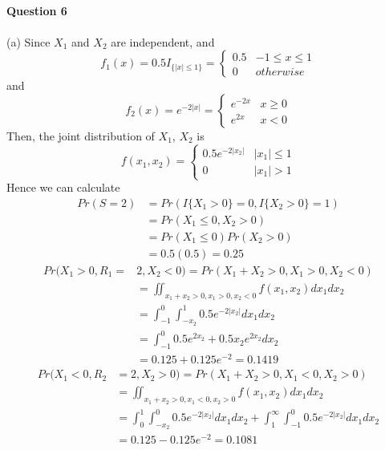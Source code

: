 \documentclass[12pt,a4paper]{article}
\begin{document}
\newpage
~\\
\indent \textbf{Question 6}\\
~\\
(a) Since $X_{1}$ and $X_{2}$ are independent, and
\begin{equation*}
f_{1}(x)=0.5I_{\{|x|\leqslant1\}}=
\begin{cases}
0.5& -1\leqslant x \leqslant 1\\
0& otherwise
\end{cases}
\end{equation*}
and
\begin{equation*}
f_{2}(x)=e^{-2|x|}=
\begin{cases}
e^{-2x}& x\geqslant 0\\
e^{2x}& x<0
\end{cases}
\end{equation*}
Then, the joint distribution of $X_{1}$, $X_{2}$ is
\begin{equation*}
f(x_{1},x_{2})=
\begin{cases}
0.5e^{-2|x_{2}|}& |x_{1}|\leqslant 1\\
0& |x_{1}|>1
\end{cases}
\end{equation*}
Hence we can calculate
\begin{align*}
Pr(S=2)&=Pr\left(I\{X_{1}>0\}=0,I\{X_{2}>0\}=1\right)\\
&=Pr(X_{1}\leqslant 0, X_{2}>0)\\
&=Pr(X_{1}\leqslant0)Pr(X_{2}>0)\\
&=0.5(0.5)=0.25
\end{align*}
\begin{align*}
Pr(X_{1}>0,R_{1}=&2,X_{2}<0)=Pr(X_{1}+X_{2}>0,X_{1}>0,X_{2}<0)\\
&=\iint_{x_{1}+x_{2}>0,x_{1}>0,x_{2}<0} f(x_{1},x_{2})dx_{1}dx_{2}\\
&=\int_{-1}^{0}\int_{-x_{2}}^{1}0.5e^{-2|x_{2}|}dx_{1}dx_{2}\\
&=\int_{-1}^{0}0.5e^{2x_{2}}+0.5x_{2}e^{2x_{2}}dx_{2}\\
&=0.125+0.125e^{-2}=0.1419
\end{align*}
\begin{align*}
Pr(X_{1}<0,R_{2}&=2,X_{2}>0)=Pr(X_{1}+X_{2}>0,X_{1}<0,X_{2}>0)\\
&=\iint_{x_{1}+x_{2}>0,x_{1}<0,x_{2}>0} f(x_{1},x_{2})dx_{1}dx_{2}\\
&=\int_{0}^{1}\int_{-x_{2}}^{0}0.5e^{-2|x_{2}|}dx_{1}dx_{2}+\int_{1}^{\infty}\int_{-1}^{0}0.5e^{-2|x_{2}|}dx_{1}dx_{2}\\
&=0.125-0.125e^{-2}=0.1081
\end{align*}
\end{document}
